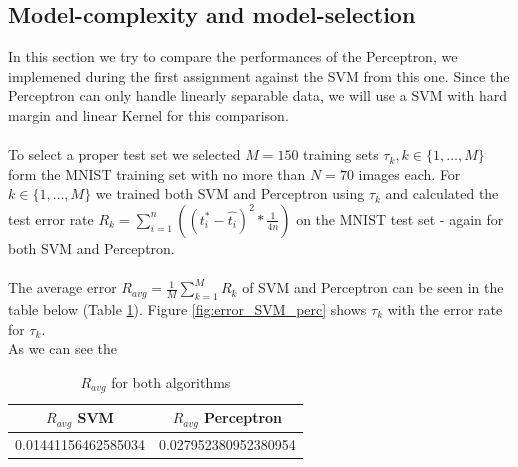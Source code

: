 \subsection{Model-complexity and model-selection}


In this section we try to compare the performances of the Perceptron, we implemened during the first assignment against the SVM from this one.
Since the Perceptron can only handle linearly separable data, we will use a SVM with hard margin and linear Kernel for this comparison.
\\
\\
To select a proper test set we selected $M = 150$ training sets $\tau _{k},k \in \{1,\ldots,M\}$ form the MNIST training set with no more than $N = 70$ images each.
For $k \in \{1,\ldots,M\}$ we trained both SVM and Perceptron using $\tau_k$ and calculated the test error rate $R_k = \sum_{i=1}^{n}( (t_{i}^{\ast} - \hat{t_{i}} )^2 * \frac{1}{4n} ) $ on the {MNIST} test set - again for both SVM and Perceptron.
\\
\\
The average error $R_{avg} = \frac{1}{M}\sum_{k=1}^M R_k$ of SVM and Perceptron can be seen in the table below (Table \ref{tab:avg_error}).
Figure \ref{fig:error_SVM_perc} shows $\tau_k$ with the error rate for $\tau_k$.\\

As we can see the

\begin{table}[!h]
 \begin{center}
\begin{tabular}{|c|c|}
 \hline
 \textbf{$R_{avg}$ SVM} & \textbf{ $R_{avg}$ Perceptron} \\
 \hline
 0.01441156462585034       &     0.027952380952380954      \\
 \hline
\end{tabular}
\caption{\label{tab:avg_error} $R_{avg}$ for both algorithms }
\end{center}
\end{table}

